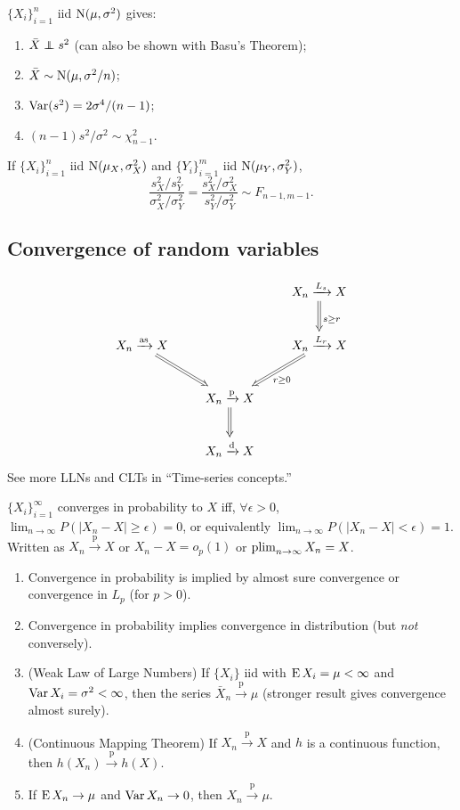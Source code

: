 \documentclass[8pt,letterpaper, landscape]{extarticle} %
\begin{document}
\begin{multicols}{3}
\begin{description}
 $ \{ X_i \}_{i=1}^{n} $ iid $ \operatorname{N} (\mu, \sigma^2 ) $ gives:
\begin{enumerate}
\item $ \bar{X} \independent s^2 $ (can also be shown with Basu's Theorem);
\item $ \bar{X} \sim \operatorname{N} (\mu, \sigma^2 / n ) $;
\item $ \operatorname{Var} (s^2) = 2 \sigma^4 / (n-1) $;
\item $ (n-1) s^2 / \sigma^2 \sim \chi^2_{n-1} $.
\end{enumerate}
If $ \{ X_i \}_{i=1}^{n} $ iid $ \operatorname{N} (\mu_X, \sigma_X^2 ) $ and $ \{ Y_i \}_{i=1}^{m} $ iid $ \operatorname{N} (\mu_Y, \sigma_Y^2 ) $, $$ \frac{s_X^2 / s_Y^2}{\sigma_X^2 / \sigma_Y^2} = \frac{s_X^2 / \sigma_X^2}{s_Y^2 / \sigma_Y^2} \sim F_{n-1, m-1} . $$

\subsection{Convergence of random variables}
\begin{displaymath}
\xymatrix{
 & & X_n \xrightarrow{L_s} X \ar@{=>}[d]^{s \geq r} \\
X_n \xrightarrow{\text{as}} X \ar@{=>}[dr] & & X_n \xrightarrow{L_r} X \ar@{=>}[dl]^{r \geq 0} \\
 & X_n \xrightarrow{\text{p}} X \ar@{=>}[d] & \\
 & X_n \xrightarrow{\text{d}} X & 
}
\end{displaymath}
See more LLNs and CLTs in ``Time-series concepts.''

 $ \{ X_i \}_{i=1}^{\infty} $ converges in probability to $ X $ iff, $ \forall \epsilon > 0 $, $ \lim_{n \to \infty} P( |X_n - X| \geq \epsilon ) =0 $, or equivalently $ \lim_{n \to \infty} P( |X_n - X| < \epsilon ) = 1 $. Written as $ X_n \xrightarrow{\text{p}} X $ or $ X_n - X = o_p (1) $ or $ \operatorname*{plim}_{n \to \infty} X_n = X $.
\begin{enumerate}
\item Convergence in probability is implied by almost sure convergence or convergence in $ L_p $ (for $ p>0 $).
\item Convergence in probability implies convergence in distribution (but \textit{not} conversely).
\item (Weak Law of Large Numbers) If $ \{ X_i \} $ iid with $ \operatorname{E} X_i = \mu < \infty $ and $ \operatorname{Var} X_i = \sigma^2 < \infty $, then the series $ \bar{X}_n \xrightarrow{\text{p}} \mu $ (stronger result gives convergence almost surely).
\item (Continuous Mapping Theorem) If $ X_n \xrightarrow{\text{p}} X $ and $ h $ is a continuous function, then $ h(X_n) \xrightarrow{\text{p}} h(X) $.
\item If $ \operatorname{E} X_n \to \mu $ and $ \operatorname{Var} X_n \to 0 $, then $ X_n \xrightarrow{\text{p}} \mu $.
\end{enumerate}


\end{description}
\end{multicols}
\end{document}
